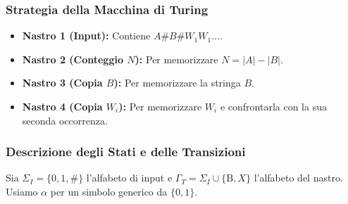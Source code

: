 \documentclass[a4paper, 11pt]{book} %
\theoremstyle{definition}
\newcommand{\B}{\text{B}} %
\begin{document}
\subsubsection{Strategia della Macchina di Turing}
\begin{itemize}
    \item \textbf{Nastro 1 (Input):} Contiene $A\#B\#W_1 W_1 \dots$.
    \item \textbf{Nastro 2 (Conteggio $N$):} Per memorizzare $N = |A| - |B|$.
    \item \textbf{Nastro 3 (Copia $B$):} Per memorizzare la stringa $B$.
    \item \textbf{Nastro 4 (Copia $W_i$):} Per memorizzare $W_i$ e confrontarla con la sua seconda occorrenza.
\end{itemize}

\subsubsection{Descrizione degli Stati e delle Transizioni}
Sia $\Sigma_I = \{0,1,\#\}$ l'alfabeto di input e $\Gamma_T = \Sigma_I \cup \{\B, X\}$ l'alfabeto del nastro. Usiamo $\alpha$ per un simbolo generico da $\{0,1\}$.
\end{document}
